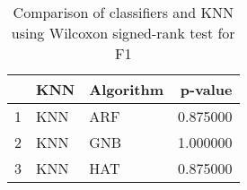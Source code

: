 \begin{table}
\footnotesize
\caption{Comparison of classifiers and KNN using Wilcoxon signed-rank test for F1}
\label{tab:KNN wilcoxon F1 comparison}
\begin{tabular}{lllr}
\hline
 & KNN & Algorithm & p-value \\
\hline
1 & KNN & ARF & 0.875000 \\
2 & KNN & GNB & 1.000000 \\
3 & KNN & HAT & 0.875000 \\
\hline
\end{tabular}
\end{table}
